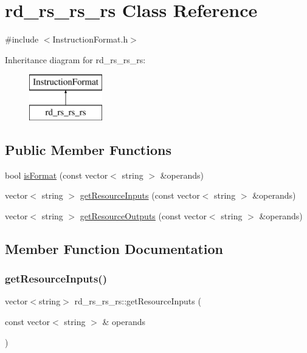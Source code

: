 \hypertarget{classrd__rs__rs__rs}{}\section{rd\+\_\+rs\+\_\+rs\+\_\+rs Class Reference}
\label{classrd__rs__rs__rs}


{\ttfamily \#include $<$Instruction\+Format.\+h$>$}

Inheritance diagram for rd\+\_\+rs\+\_\+rs\+\_\+rs\+:\begin{figure}[H]
\begin{center}
\leavevmode
\includegraphics[height=2.000000cm]{classrd__rs__rs__rs}
\end{center}
\end{figure}
\subsection*{Public Member Functions}
\begin{DoxyCompactItemize}
\item 
bool \hyperlink{classrd__rs__rs__rs_adb8dd9ede11ef73c82f331d8ab25ad02}{is\+Format} (const vector$<$ string $>$ \&operands)
\item 
vector$<$ string $>$ \hyperlink{classrd__rs__rs__rs_af94c94f5cea0acff0acd499d15b65a84}{get\+Resource\+Inputs} (const vector$<$ string $>$ \&operands)
\item 
vector$<$ string $>$ \hyperlink{classrd__rs__rs__rs_ae8da7457b4ac57c9a2cc470ebb8da345}{get\+Resource\+Outputs} (const vector$<$ string $>$ \&operands)
\end{DoxyCompactItemize}


\subsection{Member Function Documentation}
\mbox{\label{classrd__rs__rs__rs_af94c94f5cea0acff0acd499d15b65a84}} 
\subsubsection{\texorpdfstring{get\+Resource\+Inputs()}{getResourceInputs()}}
{\footnotesize\ttfamily vector$<$string$>$ rd\+\_\+rs\+\_\+rs\+\_\+rs\+::get\+Resource\+Inputs (\begin{DoxyParamCaption}\item[{const vector$<$ string $>$ \&}]{operands }\end{DoxyParamCaption})\hspace{0.3cm}{\ttfamily [virtual]}}

